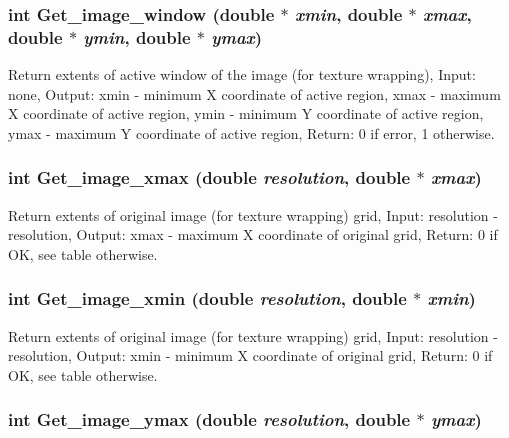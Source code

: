 \hypertarget{GisApi_8C_a59}{
\subsubsection[Get\_\-image\_\-window]{\setlength{\rightskip}{0pt plus 5cm}int Get\_\-image\_\-window (double $\ast$ {\em xmin}, double $\ast$ {\em xmax}, double $\ast$ {\em ymin}, double $\ast$ {\em ymax})}}
\label{GisApi_8C_a59}


Return extents of active window of the image (for texture wrapping), Input: none, Output: xmin - minimum X coordinate of active region, xmax - maximum X coordinate of active region, ymin - minimum Y coordinate of active region, ymax - maximum Y coordinate of active region, Return: 0 if error, 1 otherwise. 

\hypertarget{GisApi_8C_a39}{
\subsubsection[Get\_\-image\_\-xmax]{\setlength{\rightskip}{0pt plus 5cm}int Get\_\-image\_\-xmax (double {\em resolution}, double $\ast$ {\em xmax})}}
\label{GisApi_8C_a39}


Return extents of original image (for texture wrapping) grid, Input: resolution - resolution, Output: xmax - maximum X coordinate of original grid, Return: 0 if OK, see table otherwise. 

\hypertarget{GisApi_8C_a40}{
\subsubsection[Get\_\-image\_\-xmin]{\setlength{\rightskip}{0pt plus 5cm}int Get\_\-image\_\-xmin (double {\em resolution}, double $\ast$ {\em xmin})}}
\label{GisApi_8C_a40}


Return extents of original image (for texture wrapping) grid, Input: resolution - resolution, Output: xmin - minimum X coordinate of original grid, Return: 0 if OK, see table otherwise. 

\hypertarget{GisApi_8C_a41}{
\subsubsection[Get\_\-image\_\-ymax]{\setlength{\rightskip}{0pt plus 5cm}int Get\_\-image\_\-ymax (double {\em resolution}, double $\ast$ {\em ymax})}}
\label{GisApi_8C_a41}


